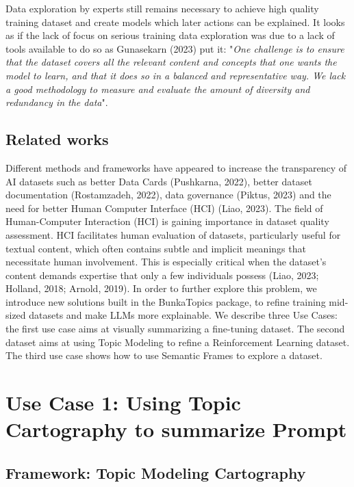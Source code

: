 \documentclass{article}
\begin{document}
Data exploration by experts still remains necessary to achieve high quality training dataset and create models which later actions can be explained. It looks as if the lack of focus on serious training data exploration was due to a lack of tools available to do so as Gunasekarn (2023) put it: "\textit{One challenge is to ensure that the dataset covers all the relevant content and concepts that one wants the model to learn, and that it does so in a balanced and representative way. We lack a good methodology to measure and evaluate the amount of diversity and redundancy in the data}". 


\subsection{Related works}

Different methods and frameworks have appeared to increase the transparency of AI datasets such as better Data Cards (Pushkarna, 2022), better dataset documentation (Rostamzadeh, 2022), data governance (Piktus, 2023) and the need for better Human Computer Interface (HCI) (Liao, 2023). The field of Human-Computer Interaction (HCI) is gaining importance in dataset quality assessment. HCI facilitates human evaluation of datasets, particularly useful for textual content, which often contains subtle and implicit meanings that necessitate human involvement. This is especially critical when the dataset's content demands expertise that only a few individuals possess (Liao, 2023; Holland, 2018; Arnold, 2019). In order to further explore this problem, we introduce new solutions built in the BunkaTopics package, to refine training mid-sized datasets and make LLMs more explainable. We describe three Use Cases: the first use case aims at visually summarizing a fine-tuning dataset. The second dataset aims at using Topic Modeling to refine a Reinforcement Learning dataset. The third use case shows how to use Semantic Frames to explore a dataset.

\section{Use Case 1: Using Topic Cartography to summarize Prompt}
\subsection{Framework: Topic Modeling Cartography}
\end{document}
